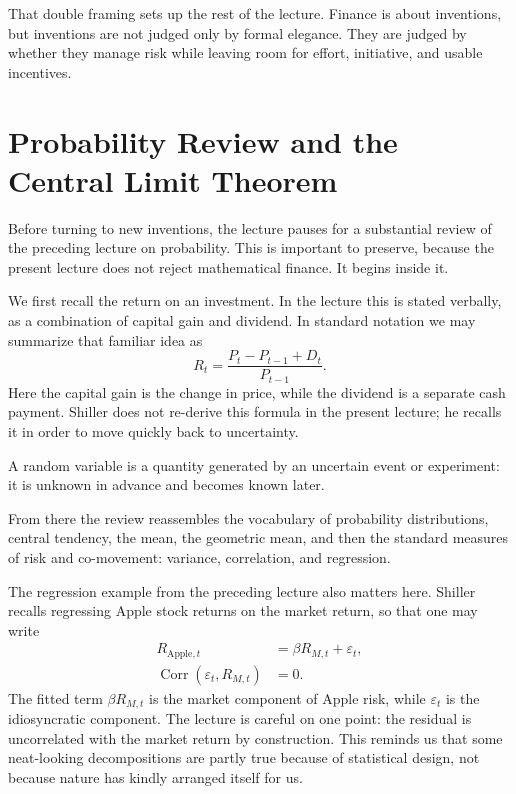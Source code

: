 That double framing sets up the rest of the lecture. Finance is about inventions, but inventions are not judged only by formal elegance. They are judged by whether they manage risk while leaving room for effort, initiative, and usable incentives.

\section{Probability Review and the Central Limit Theorem}

Before turning to new inventions, the lecture pauses for a substantial review of the preceding lecture on probability. This is important to preserve, because the present lecture does not reject mathematical finance. It begins inside it.

We first recall the return on an investment. In the lecture this is stated verbally, as a combination of capital gain and dividend. In standard notation we may summarize that familiar idea as
\begin{equation}
R_t=\frac{P_t-P_{t-1}+D_t}{P_{t-1}}.
\end{equation}
Here the capital gain is the change in price, while the dividend is a separate cash payment. Shiller does not re-derive this formula in the present lecture; he recalls it in order to move quickly back to uncertainty.

\begin{definition}
A random variable is a quantity generated by an uncertain event or experiment: it is unknown in advance and becomes known later.
\end{definition}

From there the review reassembles the vocabulary of probability distributions, central tendency, the mean, the geometric mean, and then the standard measures of risk and co-movement: variance, correlation, and regression.

The regression example from the preceding lecture also matters here. Shiller recalls regressing Apple stock returns on the market return, so that one may write
\begin{align}
R_{\text{Apple},t} &= \beta R_{M,t}+\varepsilon_t,\\
\operatorname{Corr}(\varepsilon_t,R_{M,t}) &= 0.
\end{align}
The fitted term $\beta R_{M,t}$ is the market component of Apple risk, while $\varepsilon_t$ is the idiosyncratic component. The lecture is careful on one point: the residual is uncorrelated with the market return by construction. This reminds us that some neat-looking decompositions are partly true because of statistical design, not because nature has kindly arranged itself for us.

